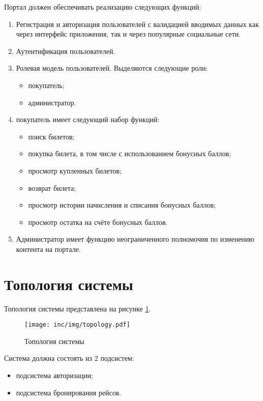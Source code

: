 Портал должен обеспечивать реализацию следующих функций:
\begin{enumerate}
	\item Регистрация и авторизация пользователей с валидацией вводимых данных как через интерфейс приложения, так и через популярные социальные сети.
	\item Аутентификация пользователей.
	\item Ролевая модель пользователей. Выделяются следующие роли:
	\begin{itemize}
		\item покупатель;
		\item администратор.
	\end{itemize}
	\item покупатель имеет следующий набор функций:
	\begin{itemize}
		\item поиск билетов;
        \item покупка билета, в том числе с использованием бонусных баллов;
        \item просмотр купленных билетов;
		\item возврат билета;
        \item просмотр истории начисления и списания бонусных баллов;
        \item просмотр остатка на счёте бонусных баллов.
	\end{itemize}
	\item Администратор имеет функцию неограниченного полномочия по изменению контента на портале.
\end{enumerate}



\section{Топология системы}  \label{topology}


Топология системы представлена на рисунке \ref{img:topology}.

\begin{figure}[h!]
  \centering
  \texttt{[image: inc/img/topology.pdf]}
  \caption{Топология системы}
  \label{img:topology}
\end{figure}




Система должна состоять из 2 подсистем:
\begin{itemize}
    \item подсистема авторизации;
    \item подсистема бронирования рейсов.
\end{itemize}

